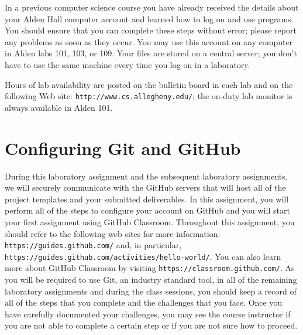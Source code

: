 \documentclass[11pt]{article}
\newcommand{\url}[1]{\lstinline{#1}}
\begin{document}
In a previous computer science course you have already received the details about your Alden Hall computer account and
learned how to log on and use programs. You should ensure that you can complete these steps without error; please report
any problems as soon as they occur. You may use this account on any computer in Alden labs 101, 103, or 109. Your files
are stored on a central server; you don't have to use the same machine every time you log on in a laboratory.

Hours of lab availability are posted on the bulletin board in each lab and on the following Web site:
\url{http://www.cs.allegheny.edu/}; the on-duty lab monitor is always available in Alden 101.

\section*{Configuring Git and GitHub}

During this laboratory assignment and the subsequent laboratory assignments, we will securely communicate with the
GitHub servers that will host all of the project templates and your submitted deliverables. In this assignment, you will
perform all of the steps to configure your account on GitHub and you will start your first assignment using GitHub
Classroom. Throughout this assignment, you should refer to the following web sites for more information:
\url{https://guides.github.com/} and, in particular, \url{https://guides.github.com/activities/hello-world/}. You can
also learn more about GitHub Classroom by visiting \url{https://classroom.github.com/}. As you will be required to use
Git, an industry standard tool, in all of the remaining laboratory assignments and during the class sessions, you should
keep a record of all of the steps that you complete and the challenges that you face. Once you have carefully documented
your challenges, you may see the course instructor if you are not able to complete a certain step or if you are not sure
how to proceed.
\end{document}
